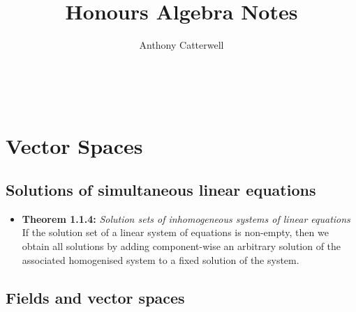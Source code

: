 \documentclass[11pt,a4paper]{article}
\title{Honours Algebra Notes}
\author{Anthony Catterwell}
\begin{document}
\maketitle
\tableofcontents

\break\

\section{Vector Spaces}

\subsection{Solutions of simultaneous linear equations}

\begin{itemize}

    \item \textbf{Theorem 1.1.4:} \emph{Solution sets of inhomogeneous systems of linear
        equations} \\
        If the solution set of a linear system of equations is non-empty,
        then we obtain all solutions by adding component-wise an arbitrary solution
        of the associated homogenised system to a fixed solution of the system.
\end{itemize}

\subsection{Fields and vector spaces}
\end{document}
